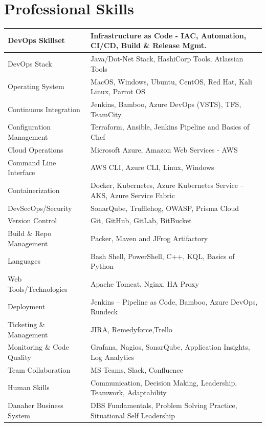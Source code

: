 \documentclass[11pt, a4paper]{article}
\begin{document}
\section*{\color{NavyBlue}Professional Skills}
\vspace{-1.5mm}
\noindent\begin{tabular}{|>{\columncolor[gray]{0.9}}p{1.8in}|p{4.7in}|}
\hline
DevOps Skillset & Infrastructure as Code - IAC, Automation, CI/CD, Build \& Release Mgmt. \\
\hline
DevOps Stack & Java/Dot-Net Stack, HashiCorp Tools, Atlassian Tools \\
\hline
Operating System & MacOS, Windows, Ubuntu, CentOS, Red Hat, Kali Linux, Parrot OS \\
\hline
Continuous Integration & Jenkins, Bamboo, Azure DevOps (VSTS), TFS, TeamCity \\
\hline
Configuration Management 	& Terraform, Ansible, Jenkins Pipeline and Basics of Chef \\
\hline
Cloud Operations 	& Microsoft Azure, Amazon Web Services - AWS \\
\hline
Command Line Interface & AWS CLI, Azure CLI, Linux, Windows \\
\hline
Containerization  & Docker, Kubernetes, Azure Kubernetes Service – AKS, Azure Service Fabric \\
\hline
DevSecOps/Security & SonarQube, Trufflehog, OWASP, Prisma Cloud \\
\hline
Version Control & Git, GitHub, GitLab, BitBucket \\
\hline
Build \& Repo Management  & Packer, Maven and JFrog Artifactory \\
\hline
Languages	 & Bash Shell, PowerShell, C++, KQL, Basics of Python \\
\hline
Web Tools/Technologies  & Apache Tomcat, Nginx, HA Proxy \\
\hline
Deployment & Jenkins – Pipeline as Code, Bamboo, Azure DevOps, Rundeck \\
\hline
Ticketing \& Management  & JIRA, Remedyforce,Trello \\
\hline
Monitoring \& Code Quality	 & Grafana, Nagios, SonarQube, Application Insights, Log Analytics \\
\hline
Team Collaboration & MS Teams, Slack, Confluence \\
\hline
Human Skills & Communication, Decision Making, Leadership, Teamwork, Adaptability \\
\hline
Danaher Business System &	DBS Fundamentals, Problem Solving Practice,  Situational Self Leadership\\
\hline
\end{tabular}
\end{document}
